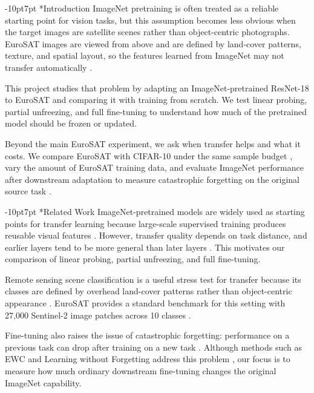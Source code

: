 \documentclass[10pt,twocolumn,letterpaper]{article}
\makeatletter
\def\cvprsection{\@startsection {section}{1}{\z@}
   {-10pt}{7pt} {\large\bfseries}}
\def\cvprssect#1{\cvprsection*{#1}}
\def\cvprsect#1{\cvprsection{\texorpdfstring{\hskip -1em.~}{}#1}}
\def\section{\@ifstar\cvprssect\cvprsect}
\makeatother
\begin{document}
\section{Introduction}
ImageNet pretraining is often treated as a reliable starting point for vision tasks, but this assumption becomes less obvious when the target images are satellite scenes rather than object-centric photographs. EuroSAT images are viewed from above and are defined by land-cover patterns, texture, and spatial layout, so the features learned from ImageNet may not transfer automatically \cite{russakovsky2015,deng2009,cheng2020,helber2019}.

This project studies that problem by adapting an ImageNet-pretrained ResNet-18 \cite{he2016,deng2009} to EuroSAT \cite{helber2019} and comparing it with training from scratch. We test linear probing, partial unfreezing, and full fine-tuning to understand how much of the pretrained model should be frozen or updated.

Beyond the main EuroSAT experiment, we ask when transfer helps and what it costs. We compare EuroSAT with CIFAR-10 under the same sample budget \cite{krizhevsky2009}, vary the amount of EuroSAT training data, and evaluate ImageNet performance after downstream adaptation to measure catastrophic forgetting on the original source task \cite{goodfellow2013,russakovsky2015}.

\section{Related Work}
ImageNet-pretrained models are widely used as starting points for transfer learning because large-scale supervised training produces reusable visual features \cite{russakovsky2015,deng2009}. However, transfer quality depends on task distance, and earlier layers tend to be more general than later layers \cite{yosinski2014}. This motivates our comparison of linear probing, partial unfreezing, and full fine-tuning.

Remote sensing scene classification is a useful stress test for transfer because its classes are defined by overhead land-cover patterns rather than object-centric appearance \cite{cheng2020}. EuroSAT provides a standard benchmark for this setting with 27,000 Sentinel-2 image patches across 10 classes \cite{helber2019}.

Fine-tuning also raises the issue of catastrophic forgetting: performance on a previous task can drop after training on a new task \cite{goodfellow2013}. Although methods such as EWC and Learning without Forgetting address this problem \cite{kirkpatrick2017,li2016}, our focus is to measure how much ordinary downstream fine-tuning changes the original ImageNet capability.
\end{document}
